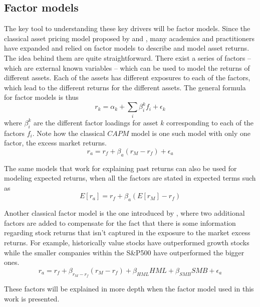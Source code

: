 \subsection{Factor models}
The key tool to understanding these key drivers will be factor models. Since the classical asset pricing model proposed by \cite{sharpe_1964} and \cite{lintner_1975}, many academics and practitioners have expanded and relied on factor models to describe and model asset returns. The idea behind them are quite straightforward. There exist a series of factors -- which are external known variables -- which can be used to model the returns of different assets. Each of the assets has different exposures to each of the factors, which lead to the different returns for the different assets. The general formula for factor models is thus
\begin{equation}
    r_k = \alpha_k + \sum_{i}\beta_i^k f_i + \epsilon_k
\end{equation}
where $\beta_i^k$ are the different factor loadings for asset $k$ corresponding to each of the factors $f_i$. 
Note how the classical $CAPM$ model is one such model with only one factor, the excess market returns. 
\begin{equation}
    r_a=r_f+\beta_a(r_M-r_f) + \epsilon_a    
\end{equation}

The same models that work for explaining past returns can also be used for modeling expected returns, when all the factors are stated in expected terms such as
\begin{equation}
    E\left[r_a\right]=r_f+\beta_a(E\left[r_M\right]-r_f)
\end{equation}

Another classical factor model is the one introduced by \cite{french_1992}, where two additional factors are added to compensate for the fact that there is some information regarding stock returns that isn't captured in the exposure to the market excess returns. For example, historically value stocks have outperformed growth stocks while the smaller companies within the S\&P500 have outperformed the bigger ones.
\begin{equation}
    r_a=r_f + \beta_{r_M-r_f}(r_M-r_f) + \beta_{HML}HML + \beta_{SMB}SMB + \epsilon_a
\end{equation}

These factors will be explained in more depth when the factor model used in this work is presented. 


